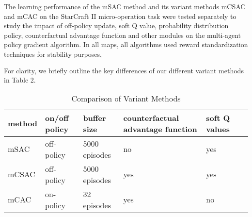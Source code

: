 \documentclass[runningheads]{llncs}
\begin{document}
  The learning performance of the mSAC method and its variant methods mCSAC and mCAC on the StarCraft II micro-operation task were tested separately to study the impact of off-policy update, soft Q value, probability distribution policy, counterfactual advantage function and other modules on the multi-agent policy gradient algorithm.
 In all maps, all algorithms used reward standardization techniques for stability purposes,

For clarity, we briefly outline the key differences of our different variant methods in Table 2.
\begin{table*}[!htbp]
	\centering
	\caption{Comparison of Variant Methods}
	\begin{tabular}{llllll}
		\hline
		method  & on/off policy  &  buffer size & counterfactual advantage function& soft Q values\\
		\hline
		mSAC &off-policy&5000 episodes&no&yes \\
		mCSAC &off-policy&5000 episodes&yes&yes \\
		mCAC &on-policy&32 episodes&yes &no \\	
		\hline
	\end{tabular}
	\label{tab:booktabs}
\end{table*}
\end{document}

